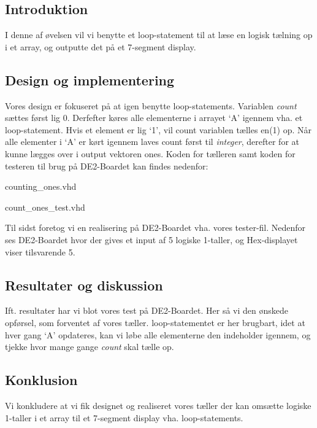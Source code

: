 \documentclass[../journal.tex]{subfiles}
\begin{document}
\subsection{Introduktion}
I denne af øvelsen vil vi benytte et loop-statement til at læse en logisk tælning op i et array, og outputte det på et 7-segment display.

\subsection{Design og implementering}
Vores design er fokuseret på at igen benytte loop-statements. Variablen \textit{count} sættes først lig 0. Derfefter køres alle elementerne i arrayet `A' igennem vha. et loop-statement. Hvis et element er lig `1', vil count variablen tælles en(1) op. Når alle elementer i `A' er kørt igennem laves count først til \textit{integer}, derefter  for at kunne lægges over i output vektoren ones. Koden for tælleren samt koden for testeren til brug på DE2-Boardet kan findes nedenfor:

\begin{table}[H]
    \centering
      \framebox{
        \rule{8pt}{0pt}
          
  }
  \caption{counting\_ones.vhd}	
  \label{src:TabConTest}
\end{table}

\begin{table}[H]
    \centering
      \framebox{
        \rule{8pt}{0pt}
          
  }
  \caption{count\_ones\_test.vhd}	
  \label{src:TabConTest}
\end{table}

Til sidst foretog vi en realisering på DE2-Boardet vha. vores tester-fil. Nedenfor ses DE2-Boardet hvor der gives et input af 5 logiske 1-taller, og Hex-displayet viser tilsvarende 5.

\subsection{Resultater og diskussion}
Ift. resultater har vi blot vores test på DE2-Boardet. Her så vi den ønskede opførsel, som forventet af vores tæller. loop-statementet er her brugbart, idet at hver gang `A' opdateres, kan vi løbe alle elementerne den indeholder igennem, og tjekke hvor mange gange \textit{count} skal tælle op.

\subsection{Konklusion}
Vi konkludere at vi fik designet og realiseret vores tæller der kan omsætte logiske 1-taller i et array til et 7-segment display vha. loop-statements.
\end{document}
